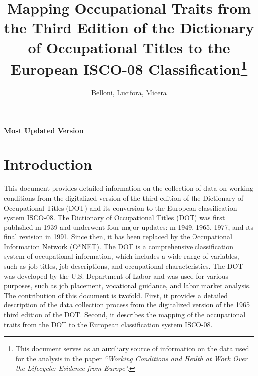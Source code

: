 \documentclass[11pt, a4paper, leqno]{article}
\title{Mapping Occupational Traits from the Third Edition of the Dictionary of Occupational Titles to the European ISCO-08 Classification\thanks{This document serves as an auxiliary source of information on the data used for the analysis in the paper \textit{``Working Conditions and Health at Work Over the Lifecycle: Evidence from Europe"}.}}
\author{Belloni, Lucifora, Micera}
\date{}
\begin{document}
\maketitle
\vspace{-6.2em}

\begin{center}  \href{https://github.com/paolomicera/DOT3rd-ISCO08/blob/main/main.pdf}{\textbf{Most Updated Version}}
\end{center}
\section{Introduction}
This document provides detailed information on the collection of data on working conditions from the digitalized version of the third edition of the Dictionary of Occupational Titles (DOT) and its conversion to the European classification system ISCO-08. 
The Dictionary of Occupational Titles (DOT) was first published in 1939 and underwent four major updates: in 1949, 1965, 1977, and its final revision in 1991. Since then, it has been replaced by the Occupational Information Network (O*NET). The DOT is a comprehensive classification system of occupational information, which includes a wide range of variables, such as job titles, job descriptions, and occupational characteristics. The DOT was developed by the U.S. Department of Labor and was used for various purposes, such as job placement, vocational guidance, and labor market analysis. The contribution of this document is twofold. First, it provides a detailed description of the data collection process from the digitalized version of the 1965 third edition of the DOT. Second, it describes the mapping of the occupational traits from the DOT to the European classification system ISCO-08.
\end{document}
